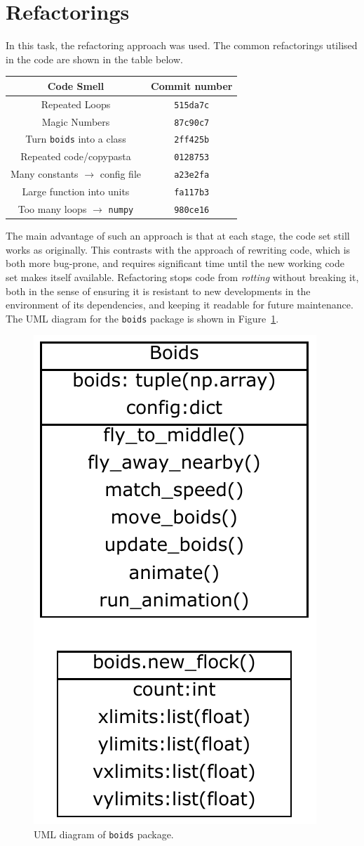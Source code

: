\documentclass{article}
\begin{document}
\section*{Refactorings}
In this task, the refactoring approach was used. The common refactorings utilised in the code are shown in the table below.
\begin{center}
\begin{tabular}{|c|c|}
    \hline
    \textbf{Code Smell} & \textbf{Commit number} \\
    \hline\hline
    Repeated Loops & \texttt{515da7c} \\
    Magic Numbers & \texttt{87c90c7} \\
    Turn \texttt{boids} into a class & \texttt{2ff425b} \\
    Repeated code/copypasta & \texttt{0128753} \\
    Many constants $\rightarrow$ config file & \texttt{a23e2fa} \\
    Large function into units & \texttt{fa117b3} \\
    Too many loops $\rightarrow$ \texttt{numpy} & \texttt{980ce16} \\
    \hline
\end{tabular}
\end{center}
The main advantage of such an approach is that at each stage, the code set still works as originally. This contrasts with the approach of rewriting code, which is both more bug-prone, and requires significant time until the new working code set makes itself available. Refactoring stops code from \emph{rotting} without breaking it, both in the sense of ensuring it is resistant to new developments in the environment of its dependencies, and keeping it readable for future maintenance. The UML diagram for the \texttt{boids} package is shown in Figure~\ref{fig:UML}.
\begin{figure}
\centering
\includegraphics[width=0.25\linewidth]{UML}
\caption{UML diagram of \texttt{boids} package.}
\label{fig:UML}
\end{figure}
\end{document}

